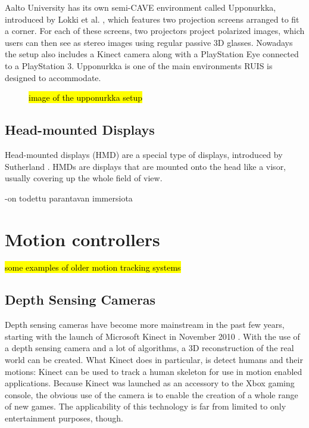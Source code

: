 \documentclass[12pt,a4paper,oneside,pdftex]{report}
\begin{document}
Aalto University has its own semi-CAVE environment called Upponurkka, introduced by Lokki et al. \cite{Upponurkka}, which features two projection screens arranged to fit a corner. For each of these screens, two projectors project polarized images, which users can then see as stereo images using regular passive 3D glasses. Nowadays the setup also includes a Kinect camera along with a PlayStation Eye connected to a PlayStation 3. Upponurkka is one of the main environments RUIS is designed to accommodate. 

\begin{figure}
\label{figure:upponurkka}
\hl{image of the upponurkka setup}
\end{figure}

\subsection{Head-mounted Displays}
\label{subsection:displayenvironments:hmd}

Head-mounted displays (HMD) are a special type of displays, introduced by Sutherland \cite{SutherlandHMD}. HMDs are displays that are mounted onto the head like a visor, usually covering up the whole field of view.

-on todettu parantavan immersiota \cite{PauschQuantifyingImmersion}

\section{Motion controllers}
\label{section:motioncontrollers}

\hl{some examples of older motion tracking systems}


\subsection{Depth Sensing Cameras}
\label{subsection:motion:kinect}

Depth sensing cameras have become more mainstream in the past few years, starting with the launch of Microsoft Kinect \cite{Kinect} in November 2010 \cite{zhang2012microsoft}. With the use of a depth sensing camera and a lot of algorithms, a 3D reconstruction of the real world can be created. What Kinect does in particular, is detect humans and their motions: Kinect can be used to track a human skeleton for use in motion enabled applications. Because Kinect was launched as an accessory to the Xbox gaming console, the obvious use of the camera is to enable the creation of a whole range of new games. The applicability of this technology is far from limited to only entertainment purposes, though.
\end{document}
